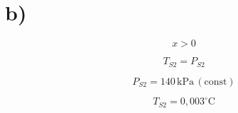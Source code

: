 

\section*{b)}

\[ x > 0 \]

\[ T_{S2} = P_{S2} \]

\[ P_{S2} = 140 \, \text{kPa} \, (\text{const}) \]

\noindent
{}

\[ T_{S2} = 0,003^\circ \text{C} \]